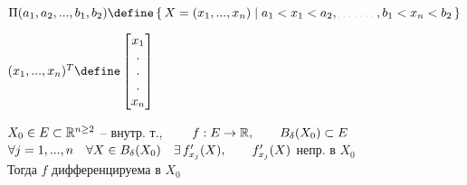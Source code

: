 \begin{notation}
    $ \Pi(a_1, a_2, ..., b_1, b_2) \define \set{X = (x_1, ..., x_n) | a_1 < x_1 < a_2, \widedots[3em], b_1 < x_n < b_2} $
\end{notation}

\begin{notation}
    $ (x_1, ..., x_n)^T \define \column{x_1}{x_n} $
\end{notation}

\begin{theorem}
    $ X_0 \in E \subset \mathbb{R}^{n \ge 2} $ -- внутр. т., $ \qquad f : E \to \mathbb{R}, \qquad B_\delta(X_0) \subset E $ \\
    $ \forall j = 1, ..., n \quad \forall X \in B_\delta(X_0) \quad \exists\, f_{x_j}'(X), \qquad f_{x_j}'(X) $ непр. в $ X_0 $ \\
    Тогда $ f $ дифференцируема в $ X_0 $
\end{theorem}

